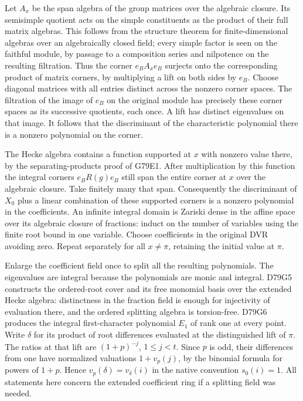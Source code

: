 Let $A_x$ be the span algebra of the group matrices over the
algebraic closure. Its semisimple quotient acts on the simple
constituents as the product of their full matrix algebras. This
follows from the structure theorem for finite-dimensional
algebras over an algebraically closed field; every simple
factor is seen on the faithful module, by passage to a composition
series and nilpotence on the resulting filtration. Thus the corner
$e_B A_x e_B$ surjects onto the corresponding product of matrix
corners, by multiplying a lift on both sides by $e_B$. Choose
diagonal matrices with all entries distinct across the nonzero
corner spaces. The filtration of the image of $e_B$ on the
original module has precisely these corner spaces as its successive
quotients, each once. A lift has distinct eigenvalues on that
image. It follows that the discriminant of the characteristic
polynomial there is a nonzero polynomial on the corner.

The Hecke algebra contains a function supported at $x$ with
nonzero value there, by the separating-products proof of G79E1.
After multiplication by this function the integral corners
$e_B R(g)e_B$ still span the entire corner at $x$ over the
algebraic closure. Take finitely many that span. Consequently the
discriminant of $X_0$ plus a linear combination of these supported
corners is a nonzero polynomial in the coefficients. An infinite
integral domain is Zariski dense in the affine space over its
algebraic closure of fractions: induct on the number of variables
using the finite root bound in one variable. Choose coefficients
in the original DVR avoiding zero. Repeat separately for all
$x\ne\pi$, retaining the initial value at $\pi$.

Enlarge the coefficient field once to split all the resulting
polynomials. The eigenvalues are integral because the polynomials
are monic and integral. D79G5 constructs the ordered-root cover
and its free monomial basis over the extended Hecke algebra:
distinctness in the fraction field is enough for injectivity of
evaluation there, and the ordered splitting algebra is torsion-free.
D79G6 produces the integral first-character polynomial $E_1$
of rank one at every point. Write $\delta$ for its product of
root differences evaluated at the distinguished lift of $\pi$.
The ratios at that lift are $(1+p)^{-j}$, $1\le j<t$.
Since $p$ is odd, their differences from one have normalized
valuations $1+v_p(j)$, by the binomial formula for powers of
$1+p$. Hence $v_p(\delta)=v_\delta(i)$ in the native convention
$s_0(i)=1$. All statements here concern the extended coefficient
ring if a splitting field was needed.

